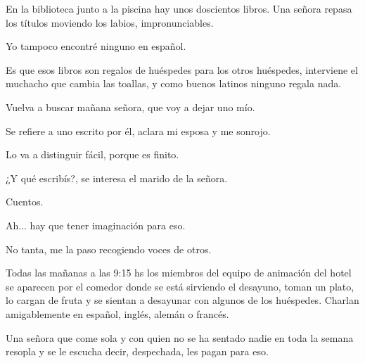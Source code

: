 \documentclass[11pt,twoside,openright,a6paper]{book}
\begin{document}
\vspace{0.5cm}
\hrulefill\hspace{0.2cm} \decofourleft\decofourright \hspace{0.2cm} \hrulefill
\vspace{0.5cm}

En la biblioteca junto a la piscina hay unos doscientos libros.  Una señora
repasa los títulos moviendo los labios, impronunciables.

Yo tampoco encontré ninguno en español.

Es que esos libros son regalos de huéspedes para los otros huéspedes,
interviene el muchacho que cambia las toallas, y como buenos latinos ninguno
regala nada.

Vuelva a buscar mañana señora, que voy a dejar uno mío.

Se refiere a uno escrito por él, aclara mi esposa y me sonrojo.

Lo va a distinguir fácil, porque es finito.

¿Y qué escribís?, se interesa el marido de la señora.

Cuentos.

Ah... hay que tener imaginación para eso.

No tanta, me la paso recogiendo voces de otros.


\vspace{0.5cm}
\hrulefill\hspace{0.2cm} \decofourleft\decofourright \hspace{0.2cm} \hrulefill
\vspace{0.5cm}

Todas las mañanas a las 9:15 hs los miembros del equipo de animación del
hotel se aparecen por el comedor donde se está sirviendo el desayuno, toman
un plato, lo cargan de fruta y se sientan a desayunar con algunos de los
huéspedes. Charlan amigablemente en español, inglés, alemán o francés.

Una señora que come sola y con quien no se ha sentado nadie en toda la
semana resopla y se le escucha decir, despechada, les pagan para eso.


\vspace{0.5cm}
\hrulefill\hspace{0.2cm} \decofourleft\decofourright \hspace{0.2cm} \hrulefill
\vspace{0.5cm}
\end{document}
